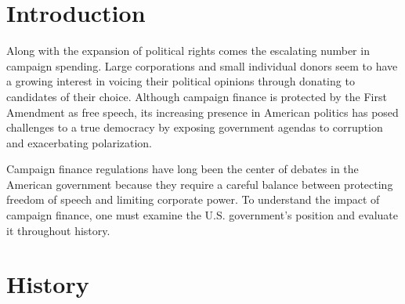 

\section{Introduction}

Along with the expansion of political rights comes the escalating number in campaign spending. Large corporations and small individual donors seem to have a growing interest in voicing their political opinions through donating to candidates of their choice. Although campaign finance is protected by the First Amendment as free speech, its increasing presence in American politics has posed challenges to a true democracy by exposing government agendas to corruption and exacerbating polarization. 

Campaign finance regulations have long been the center of debates in the American government because they require a careful balance between protecting freedom of speech and limiting corporate power. To understand the impact of campaign finance, one must examine the U.S. government’s position and evaluate it throughout history. 

\section{History}


